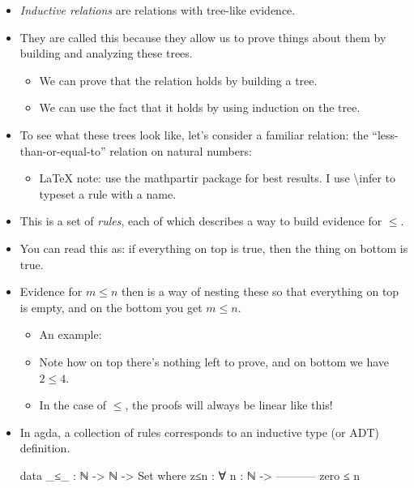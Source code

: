 \documentclass{lecturenotes}
\begin{document}
\begin{itemize}
\item \emph{Inductive relations} are relations with tree-like evidence.
\item They are called this because they allow us to prove things about them by building and analyzing these trees.
  \begin{itemize}
  \item We can prove that the relation holds by building a tree.
  \item We can use the fact that it holds by using induction on the tree.
  \end{itemize}
\item To see what these trees look like, let's consider a familiar relation: the ``less-than-or-equal-to'' relation on natural numbers:
  \begin{itemize}
  \item \LaTeX{} note: use the \textsf{mathpartir} package for best results.
    I use \textsf{\textbackslash{}infer\ast} to typeset a rule with a name.
  \end{itemize}
\item This is a set of \emph{rules}, each of which describes a way to build evidence for $\leq$.
\item You can read this as: if everything on top is true, then the thing on bottom is true.
\item Evidence for $m \leq n$ then is a way of nesting these so that everything on top is empty, and on the bottom you get $m \leq n$.
  \begin{itemize}
  \item An example:
    \begin{mathpar}
    \end{mathpar}
  \item Note how on top there's nothing left to prove, and on bottom we have $2 \leq 4$.
  \item In the case of $\leq$, the proofs will always be linear like this!
  \end{itemize}
\item In agda, a collection of rules corresponds to an inductive type (or ADT) definition.
\begin{code}
data _≤_ : ℕ -> ℕ -> Set where
  z≤n : ∀ {n : ℕ} ->
       -----------
        zero ≤ n


\end{code}
\end{itemize}
\end{document}

